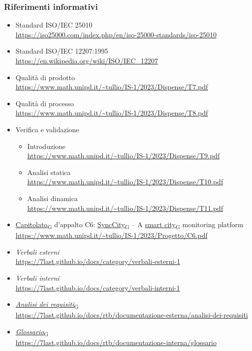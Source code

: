\subsubsection{Riferimenti informativi}
\begin{itemize}
    \item Standard ISO/IEC 25010 \\
        \url{https://iso25000.com/index.php/en/iso-25000-standards/iso-25010}
    \item Standard ISO/IEC 12207:1995 \\
        \url{https://en.wikipedia.org/wiki/ISO/IEC_12207}
    \item Qualità di prodotto \\
        \url{https://www.math.unipd.it/~tullio/IS-1/2023/Dispense/T7.pdf}
    \item Qualità di processo \\
        \url{https://www.math.unipd.it/~tullio/IS-1/2023/Dispense/T8.pdf}
    \item Verifica e validazione
        \begin{itemize}
            \item Introduzione \\
                \url{https://www.math.unipd.it/~tullio/IS-1/2023/Dispense/T9.pdf}
            \item Analisi statica \\
                \url{https://www.math.unipd.it/~tullio/IS-1/2023/Dispense/T10.pdf}
            \item Analisi dinamica \\
                \url{https://www.math.unipd.it/~tullio/IS-1/2023/Dispense/T11.pdf}
        \end{itemize}
    \item \href{https://7last.github.io/docs/rtb/documentazione-interna/glossario\#capitolato}{Capitolato\textsubscript{G}} d'appalto C6: \href{https://7last.github.io/docs/rtb/documentazione-interna/glossario\#synccity}{SyncCity\textsubscript{G}} – A \href{https://7last.github.io/docs/rtb/documentazione-interna/glossario\#smart-city}{smart city\textsubscript{G}} monitoring platform\\
        \url{https://www.math.unipd.it/~tullio/IS-1/2023/Progetto/C6.pdf}
    \item \textit{Verbali esterni} \\
        \url{https://7last.github.io/docs/category/verbali-esterni-1}
    \item \textit{Verbali interni} \\
        \url{https://7last.github.io/docs/category/verbali-interni-1}
    \item \href{https://7last.github.io/docs/rtb/documentazione-interna/glossario\#analisi-dei-requisiti}{\textit{Analisi dei requisiti}\textsubscript{G}} \\
        \url{https://7last.github.io/docs/rtb/documentazione-esterna/analisi-dei-requisiti}
    \item \href{https://7last.github.io/docs/rtb/documentazione-interna/glossario\#glossario}{\textit{Glossario}\textsubscript{G}} \\
        \url{https://7last.github.io/docs/rtb/documentazione-interna/glossario}
\end{itemize}
